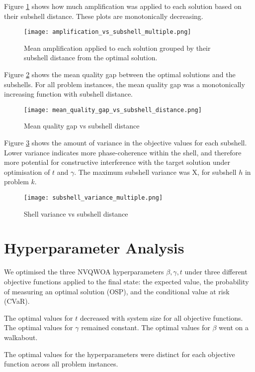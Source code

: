 Figure \ref{fig:amp vs sub} shows how much amplification was applied to each solution based on their subshell distance. These plots are monotonically decreasing. 
\begin{figure}[htbp]
    \centering
    \texttt{[image: amplification\_vs\_subshell\_multiple.png]}
    \caption{Mean amplification applied to each solution grouped by their subshell distance from the optimal solution.}
    \label{fig:amp vs sub}
\end{figure}

Figure \ref{fig:mqg} shows the mean quality gap between the optimal solutions and the subshells. For all problem instances, the mean quality gap was a monotonically increasing function with subshell distance.
\begin{figure}[htbp]
    \centering
    \texttt{[image: mean\_quality\_gap\_vs\_subshell\_distance.png]}
    \caption{Mean quality gap vs subshell distance}
    \label{fig:mqg}
\end{figure}

Figure \ref{fig:shell variance} shows the amount of variance in the objective values for each subshell.
Lower variance indicates more phase-coherence within the shell, and therefore more potential for constructive interference with the target solution under optimisation of $t$ and $\gamma$. The maximum subshell variance was X, for subshell $h$ in problem $k$.
\begin{figure}[htbp]
    \centering
    \texttt{[image: subshell\_variance\_multiple.png]}
    \caption{Shell variance vs subshell distance}
    \label{fig:shell variance}
\end{figure}

\section{Hyperparameter Analysis}
We optimised the three NVQWOA hyperparameters $\beta, \gamma, t$ under three different objective functions applied to the final state: the expected value, the probability of measuring an optimal solution (OSP), and the conditional value at risk (CVaR).

The optimal values for $t$ decreased with system size for all objective functions. The optimal values for $\gamma$ remained constant. The optimal values for $\beta$ went on a walkabout.

The optimal values for the hyperparameters were distinct for each objective function across all problem instances.

